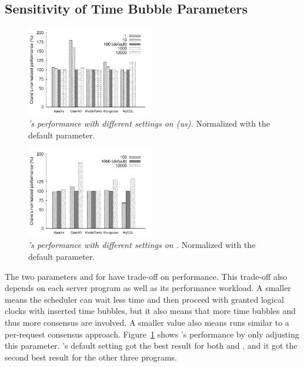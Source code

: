 \subsection{Sensitivity of Time Bubble Parameters} \label{sec:sensitivity}
\begin{figure}[t]
\centering
\includegraphics[width=0.5\textwidth]{figures/usleep-sensitivity}
\vspace{-.10in}
\caption{\small {\em \xxx's performance with different settings on \ntimeout 
(us).} Normalized with the default parameter.}
\label{fig:usleep-sensitivity}
\end{figure}

\begin{figure}[t]
\centering
\includegraphics[width=0.5\textwidth]{figures/nclock-sensitivity}
\vspace{-.10in}
\caption{\small {\em \xxx's performance with different settings on \nclock.} 
Normalized with the default parameter.}
\label{fig:nclock-sensitivity}
\end{figure}

The two parameters \ntimeout and \nclock for \timealgo have trade-off on 
performance. This trade-off also depends on each server program as well as its 
performance workload. A smaller \ntimeout means the \dmt 
scheduler can wait less time and then proceed with granted logical clocks with 
inserted time bubbles, but it also means that more time bubbles and thus more 
\paxos consensus are involved. A smaller value also means \timealgo runs 
similar to a per-request consensus approach. 
Figure~\ref{fig:usleep-sensitivity} shows \xxx's performance by only adjusting 
this parameter. \xxx's default setting got the best result for both \apache 
and \clamav, and it got the second best result for the other three programs. 

